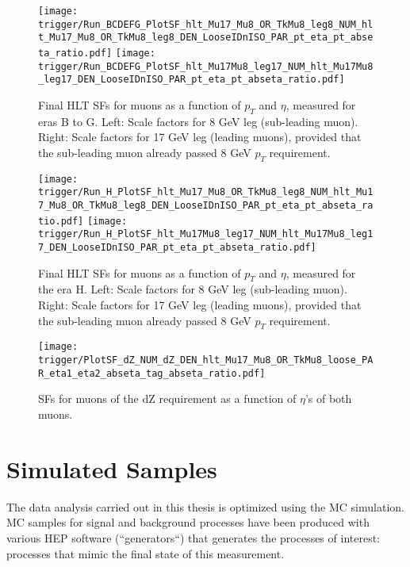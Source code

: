 \begin{figure}[H]
\centering
\texttt{[image: trigger/Run\_BCDEFG\_PlotSF\_hlt\_Mu17\_Mu8\_OR\_TkMu8\_leg8\_NUM\_hlt\_Mu17\_Mu8\_OR\_TkMu8\_leg8\_DEN\_LooseIDnISO\_PAR\_pt\_eta\_pt\_abseta\_ratio.pdf]}
\texttt{[image: trigger/Run\_BCDEFG\_PlotSF\_hlt\_Mu17Mu8\_leg17\_NUM\_hlt\_Mu17Mu8\_leg17\_DEN\_LooseIDnISO\_PAR\_pt\_eta\_pt\_abseta\_ratio.pdf]}\\
\caption[Final HLT SFs for muons as a function of $p_{T}$ and $\eta$, measured for eras B to G.]{Final HLT SFs for muons as a function of $p_{T}$ and $\eta$, measured for eras B to G. Left: Scale factors for 8 GeV leg (sub-leading muon). Right: Scale factors for 17 GeV leg (leading muons), provided that the sub-leading muon already passed 8 GeV $p_T$ requirement.}
\label{fig:trigger_SF_dimu_BCDEFG}
\end{figure}

\begin{figure}[H]
\centering
\texttt{[image: trigger/Run\_H\_PlotSF\_hlt\_Mu17\_Mu8\_OR\_TkMu8\_leg8\_NUM\_hlt\_Mu17\_Mu8\_OR\_TkMu8\_leg8\_DEN\_LooseIDnISO\_PAR\_pt\_eta\_pt\_abseta\_ratio.pdf]}
\texttt{[image: trigger/Run\_H\_PlotSF\_hlt\_Mu17Mu8\_leg17\_NUM\_hlt\_Mu17Mu8\_leg17\_DEN\_LooseIDnISO\_PAR\_pt\_eta\_pt\_abseta\_ratio.pdf]}\\
\caption[Final HLT SFs for muons as a function of $p_{T}$ and $\eta$, measured for the era H.]{Final HLT SFs for muons as a function of $p_{T}$ and $\eta$, measured for the era H. Left: Scale factors for 8 GeV leg (sub-leading muon). Right: Scale factors for 17 GeV leg (leading muons), provided that the sub-leading muon already passed 8 GeV $p_T$ requirement.}
\label{fig:trigger_SF_dimu_H}
\end{figure}

\begin{figure}[H]
\centering
\texttt{[image: trigger/PlotSF\_dZ\_NUM\_dZ\_DEN\_hlt\_Mu17\_Mu8\_OR\_TkMu8\_loose\_PAR\_eta1\_eta2\_abseta\_tag\_abseta\_ratio.pdf]}
\caption[SFs for muons of the dZ requirement .]{SFs for muons of the dZ requirement as a function of $\eta$'s of both muons.}
\label{fig:trigger_SF_dimu_dZ_H}
\end{figure}

\section{Simulated Samples}
\label{sec:simulated_samples}

The data analysis carried out in this thesis is optimized using the MC simulation. MC samples for signal and background processes have been produced with various HEP software (``generators``) that generates the processes of interest: processes that mimic the final state of this measurement. 

